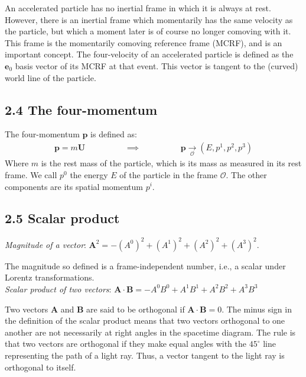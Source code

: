 \documentclass[11pt,letterpaper]{book}
\begin{document}
        An accelerated particle has no inertial frame in which it is always at rest. However, there is an inertial frame which momentarily has the same velocity as the particle, but which a moment later is of course no longer comoving with it. This frame is the momentarily comoving reference frame (MCRF), and is an important concept. The four-velocity of an accelerated particle is defined as the \( \mathbf{e}_0 \) basis vector of its MCRF at that event. This vector is tangent to the (curved) world line of the particle.

    \subsection{2.4 The four-momentum}
        The four-momentum \(\mathbf{p}\) is defined as:
        \begin{align}
            \mathbf{p} = m \mathbf{U} \hspace{2cm} \implies \hspace{2cm} \mathbf{p} \underset{\mathcal{O}}{\rightarrow} (E, p^1, p^2, p^3)
        \end{align}
        Where \(m\) is the rest mass of the particle, which is its mass as measured in its rest frame. We call \(p^0\) the energy \(E\) of the particle in the frame \(\mathcal{O}\). The other components are its spatial momentum \(p^i\).
        
    \subsection{2.5 Scalar product}
        
        \textit{Magnitude of a vector}: \(\mathbf{A}^2 = -(A^0)^2 + (A^1)^2 + (A^2)^2 + (A^3)^2\). 
        
        The magnitude so defined is a frame-independent number, i.e., a scalar under Lorentz transformations.\\ 
        
         \textit{Scalar product of two vectors}: \(\mathbf{A} \cdot \mathbf{B} = -A^0B^0 + A^1B^1 + A^2B^2 + A^3B^3\)
         
        Two vectors \( \mathbf{A} \) and \( \mathbf{B} \) are said to be orthogonal if \( \mathbf{A} \cdot \mathbf{B} = 0 \). The minus sign in the definition of the scalar product means that two vectors orthogonal to one another are not necessarily at right angles in the spacetime diagram. The rule is that two vectors are orthogonal if they make equal angles with the \(45^\circ \) line representing the path of a light ray. Thus, a vector tangent to the light ray is orthogonal to itself.
    
\end{document}
